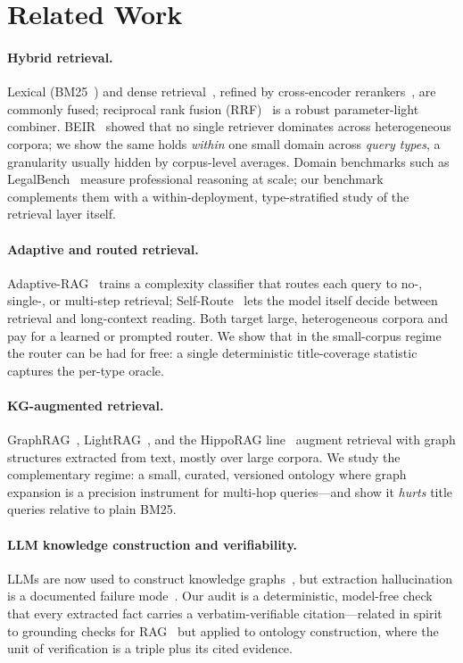 \documentclass[runningheads]{llncs}
\begin{document}
\section{Related Work}
\label{sec:related}

\paragraph{Hybrid retrieval.} Lexical (BM25~\cite{bm25}) and dense
retrieval~\cite{dpr,realm}, refined by cross-encoder
rerankers~\cite{monobert}, are commonly fused; reciprocal rank fusion
(RRF)~\cite{rrf} is a robust parameter-light combiner. BEIR~\cite{beir} showed
that no single retriever dominates across heterogeneous corpora; we show the
same holds \emph{within} one small domain across \emph{query types}, a
granularity usually hidden by corpus-level averages. Domain benchmarks such
as LegalBench~\cite{legalbench} measure professional reasoning at scale; our
benchmark complements them with a within-deployment, type-stratified study of
the retrieval layer itself.

\paragraph{Adaptive and routed retrieval.} Adaptive-RAG~\cite{adaptiverag}
trains a complexity classifier that routes each query to no-, single-, or
multi-step retrieval; Self-Route~\cite{selfroute} lets the model itself
decide between retrieval and long-context reading. Both target large,
heterogeneous corpora and pay for a learned or prompted router. We show that
in the small-corpus regime the router can be had for free: a single
deterministic title-coverage statistic captures the per-type oracle.

\paragraph{KG-augmented retrieval.} GraphRAG~\cite{graphrag},
LightRAG~\cite{lightrag}, and the HippoRAG line~\cite{hipporag,hipporag2}
augment retrieval with graph structures extracted from text, mostly over
large corpora. We study the complementary regime: a
small, curated, versioned ontology where graph expansion is a precision
instrument for multi-hop queries---and show it \emph{hurts} title queries
relative to plain BM25.

\paragraph{LLM knowledge construction and verifiability.} LLMs are now used to
construct knowledge graphs~\cite{zhu2024llmkg,pan2024roadmap}, but extraction
hallucination is a documented failure mode~\cite{hallucination-survey}. Our
audit is a deterministic, model-free check that every extracted fact carries a
verbatim-verifiable citation---related in spirit to grounding checks for
RAG~\cite{rag-survey} but applied to ontology construction, where the unit of
verification is a triple plus its cited evidence.
\end{document}
